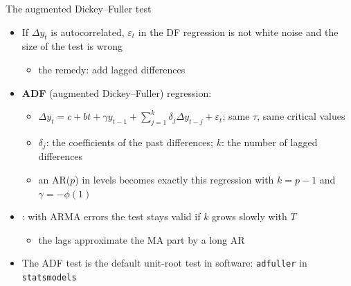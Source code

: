 \begin{frame}{The augmented Dickey--Fuller test}
\itemsize{\small}
\begin{itemize}
    \item If $\Delta y_t$ is autocorrelated, $\varepsilon_t$ in the DF regression is not white noise and the size of the test is wrong
    \begin{itemize}
        \item the remedy: add lagged differences
    \end{itemize}
    \item \textbf{ADF} (augmented Dickey--Fuller) regression:
    \begin{itemize}
        \item $\Delta y_t = c + bt + \gamma y_{t-1} + \sum_{j=1}^{k} \delta_j \Delta y_{t-j} + \varepsilon_t$; same $\tau$, same critical values
        \item $\delta_j$: the coefficients of the past differences; $k$: the number of lagged differences
        \item an AR($p$) in levels becomes exactly this regression with $k = p - 1$ and $\gamma = -\phi(1)$
    \end{itemize}
    \item {}: with ARMA errors the test stays valid if $k$ grows slowly with $T$
    \begin{itemize}
        \item the lags approximate the MA part by a long AR
    \end{itemize}
    \item The ADF test is the default unit-root test in software: \texttt{adfuller} in \texttt{statsmodels}
\end{itemize}
\end{frame}

